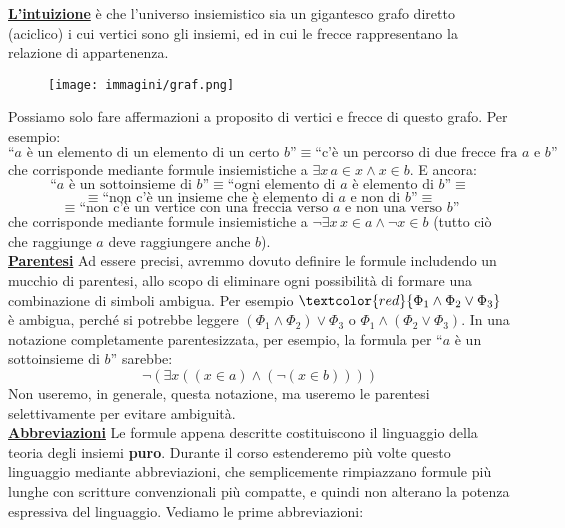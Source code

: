 \documentclass[11pt]{scrartcl}
\begin{document}
\textbf{\underline{L'intuizione}} è che l'universo insiemistico sia un gigantesco grafo diretto (aciclico) i cui vertici sono gli insiemi,
ed in cui le frecce rappresentano la relazione di appartenenza.

\begin{center}
	\begin{figure}[h]
		\centering
		\texttt{[image: immagini/graf.png]}
	\end{figure}
\end{center}

Possiamo solo fare affermazioni a proposito di vertici e frecce di questo grafo. Per esempio:
\[ \text{``$a$ è un elemento di un elemento di un certo $b$''} \equiv \text{``c'è un percorso di due frecce fra $a$ e $b$''} 
	\]
che corrisponde mediante formule insiemistiche a $ \exists x \, a \in x \land x \in b$. E ancora:
\[\text{``$a$ è un sottoinsieme di $b$''} \equiv \text{``ogni elemento di $a$ è elemento di $b$''} \equiv \]\[
		\equiv\text{``non c'è un insieme che è elemento di $a$ e non di $b$''}\equiv\]\[
	 \equiv \text{``non c'è un vertice con una freccia verso $a$ e non una verso $b$''}
	\]
che corrisponde mediante formule insiemistiche a $\neg\exists x \, x \in a \land \neg x \in b$ (tutto ciò che raggiunge $a$ deve raggiungere anche $b$).\\
\textbf{\underline{Parentesi}} Ad essere precisi, avremmo dovuto definire le formule includendo un mucchio di parentesi, allo scopo di eliminare ogni possibilità
di formare una combinazione di simboli ambigua. Per esempio $\textcolor{red}{\Phi_1 \land \Phi_2 \lor \Phi_3}$ è ambigua, perché si potrebbe leggere $(\Phi_1 \land \Phi_2) \lor \Phi_3$
o $\Phi_1 \land (\Phi_2 \lor \Phi_3)$. In una notazione completamente parentesizzata, per esempio, la formula per ``$a$ è un sottoinsieme di $b$'' sarebbe:
\[ \neg(\exists x((x \in a)\land(\neg(x \in b))))
	\]
Non useremo, in generale, questa notazione, ma useremo le parentesi selettivamente per evitare ambiguità.\\
\textbf{\underline{Abbreviazioni}} Le formule appena descritte costituiscono il linguaggio della teoria degli insiemi \textbf{puro}. Durante il corso estenderemo
più volte questo linguaggio mediante abbreviazioni, che semplicemente rimpiazzano formule più lunghe con scritture convenzionali più compatte, e quindi non alterano 
la potenza espressiva del linguaggio. Vediamo le prime abbreviazioni:
\end{document}

